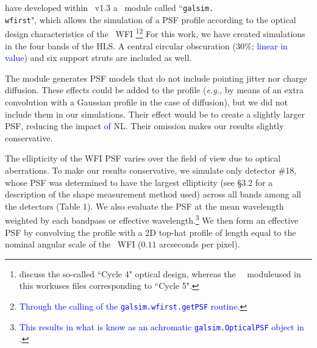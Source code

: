 \documentclass[preprint]{aastex}
\begin{document}
\citet{kannawadi15} have developed within \gs\ v1.3 a \wfa\ module called ``{\tt{galsim.\\ wfirst}}", which allows the simulation of a PSF profile according to the optical design characteristics of the \wfa\ WFI \citep{pasquale14}\footnote{\citealt{pasquale14} discuss the so-called ``Cycle 4" optical design, whereas the \gs\ \wfa\ module\textemdash used in this work\textemdash uses files corresponding to ``Cycle 5".}\footnote{\textcolor{blue}{Through the calling of the {\tt{galsim.wfirst.getPSF}} routine.}} 
For this work, we have created simulations in the four bands of the HLS.  A central circular obscuration ($30 \%$; \textcolor{blue}{linear in value}) and six support struts are included as well. %

The module generates PSF models that do not include pointing jitter nor charge diffusion. These effects could be added to the profile (\emph{e.g.,} by means of an extra convolution with a Gaussian profile in the case of diffusion), but we did not include them in our simulations. Their effect would be to create a slightly larger PSF, reducing the impact \textcolor{blue}{of} NL. Their omission makes our results slightly conservative.  

The ellipticity of the WFI PSF varies over the field of view due to optical aberrations. To make our results conservative, we simulate only detector \#18, whose PSF was determined to have the largest ellipticity (see \S3.2 for a description of the shape measurement method used) across all bands among all the detectors (Table 1). We also evaluate the PSF at the mean wavelength weighted by each bandpass or effective wavelength.\footnote{\textcolor{blue}{This results in what is know as an achromatic {\tt{galsim.OpticalPSF}} object in \gs.}}
We then form an effective PSF by convolving the profile with a 2D top-hat profile of length equal to the nominal angular scale of the \wfa\ WFI ($0.11$ arcseconds per pixel). 
\end{document}
